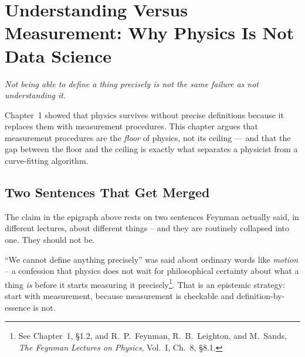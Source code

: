 \documentclass[12pt]{book}
\begin{document}
\setcounter{chapter}{1}

\chapter[Understanding Versus Measurement]{Understanding Versus Measurement: Why Physics Is Not Data Science}
\label{ch:understanding}

\begin{mottobox}
\noindent\textit{Not being able to define a thing precisely is not the same failure as not understanding it.}

\vspace{4pt}
\noindent\small Chapter~1 showed that physics survives without precise definitions because it replaces them with measurement procedures. This chapter argues that measurement procedures are the \emph{floor} of physics, not its ceiling --- and that the gap between the floor and the ceiling is exactly what separates a physicist from a curve-fitting algorithm.
\end{mottobox}

\section{Two Sentences That Get Merged}
\label{sec:two-sentences}

The claim in the epigraph above rests on two sentences Feynman actually said, in different lectures, about different things -- and they are routinely collapsed into one. They should not be.

``We cannot define anything precisely'' was said about ordinary words like \emph{motion} -- a confession that physics does not wait for philosophical certainty about what a thing \emph{is} before it starts measuring it precisely\footnote{See Chapter~1, \S1.2, and R.~P.~Feynman, R.~B.~Leighton, and M.~Sands, \emph{The Feynman Lectures on Physics}, Vol.~I, Ch.~8, \S8.1.}. That is an epistemic strategy: start with measurement, because measurement is checkable and definition-by-essence is not.
\end{document}
